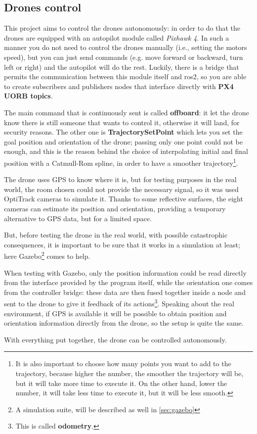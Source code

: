 \subsection{Drones control}

This project aims to control the drones autonomously: in order to do that the drones are equipped with an autopilot module called \textit{Pixhawk 4}. In such a manner you do not need to control the drones manually (i.e., setting the motors speed), but you can just send commands (e.g. move forward or backward, turn left or right) and the autopilot will do the rest. Luckily, there is a bridge that permits the communication between this module itself and \acrshort{ros}2, so you are able to create subscribers and publishers nodes that interface directly with \textbf{PX4 UORB topics}\cite{px4}.

The main command that is continuously sent is called \textbf{offboard}: it let the drone know there is still someone that wants to control it, otherwise it will land, for security reasons. The other one is \textbf{TrajectorySetPoint} which lets you set the goal position and orientation of the drone; passing only one point could not be enough, and this is the reason behind the choice of interpolating initial and final position with a Catmull-Rom spline, in order to have a smoother trajectory\footnote{It is also important to choose how many points you want to add to the trajectory, because higher the number, the smoother the trajectory will be, but it will take more time to execute it. On the other hand, lower the number, it will take less time to execute it, but it will be less smooth.}.

The drone uses GPS to know where it is, but for testing purposes in the real world, the room chosen could not provide the necessary signal, so it was used OptiTrack cameras to simulate it. Thanks to some reflective surfaces, the eight cameras can estimate its position and orientation, providing a temporary alternative to GPS data, but for a limited space.

But, before testing the drone in the real world, with possible catastrophic consequences, it is important to be sure that it works in a simulation at least; here Gazebo\footnote{A simulation suite, will be described as well in \autoref{sec:gazebo}} comes to help.

When testing with Gazebo, only the position information could be read directly from the interface provided by the program itself, while the orientation one comes from the controller bridge: these data are then fused together inside a node and sent to the drone to give it feedback of its actions\footnote{This is called \textbf{odometry}.}. Speaking about the real environment, if GPS is available it will be possible to obtain position and orientation information directly from the drone, so the setup is quite the same. 

With everything put together, the drone can be controlled autonomously.